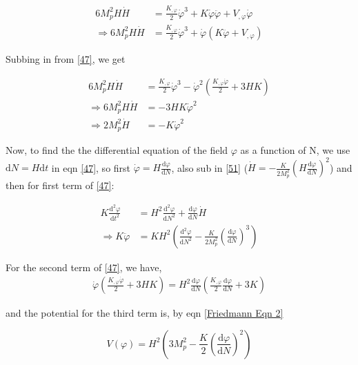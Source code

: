 \documentclass{article}
\begin{document}
\begin{align}   
     6 M_p^2H \dot{H} &= \frac{K_{,\varphi}}{2} \dot{\varphi}^3 + K \dot{\varphi} \ddot{\varphi} + V_{,\varphi} \dot{\varphi} \nonumber \\
     \Rightarrow 6 M_p^2H \dot{H} &= \frac{K_{,\varphi}}{2} \dot{\varphi}^3 + \dot{\varphi} (K  \ddot{\varphi} + V_{,\varphi}) 
\end{align}

Subbing in from \ref{47}, we get

\begin{align}   \label{51}
    6 M_p^2H \dot{H} &= \frac{K_{,\varphi}}{2} \dot{\varphi}^3 - \dot{\varphi}^2 \left(\frac{K_{,\varphi} \dot{\varphi}}{2} + 3H K \right) \nonumber \\
    \Rightarrow 6 M_p^2H \dot{H} &= - 3H K \dot{\varphi}^2   \nonumber \\ 
    \Rightarrow 2 M_p^2 \dot{H} &= -  K \dot{\varphi}^2
\end{align}

Now, to find the the differential equation of the field $\varphi$ as a function of N, we use $\text{d}N = H \text{d}t$ in eqn \ref{47}, so first $ \dot{\varphi} = H \frac{\text{d}\varphi}{\text{d}N}$, also sub in \ref{51} ($\dot{H} = -  \frac{K}{2 M_p^2 } \left(H \frac{\text{d}\varphi}{\text{d}N} \right)^2$) and then for first term of \ref{47}:

\begin{align} \label{52}
    K \frac{\text{d}^2\varphi}{\text{d}t^2} &= H^2 \frac{\text{d}^2\varphi}{\text{d}N^2} + \frac{\text{d}\varphi}{\text{d}N}\dot{H} \nonumber \\
    \Rightarrow K \ddot{\varphi} &= K H^2 \left( \frac{\text{d}^2\varphi}{\text{d}N^2} - \frac{K}{2M_p^2} \left(\frac{\text{d}\varphi}{\text{d}N} \right)^3 \right) 
\end{align}

For the second term of \ref{47}, we have, 
\begin{align}
    \dot{\varphi} \left(\frac{K_{,\varphi} \dot{\varphi}}{2} + 3H K \right) = H^2 \frac{\text{d}\varphi}{\text{d}N} \left(\frac{K_{,\varphi}}{2} \frac{\text{d}\varphi}{\text{d}N}+ 3 K \right)
\end{align}

and the potential for the third term is, by eqn \ref{Friedmann Eqn 2}

\begin{equation}
    V(\varphi) = H^2 \left( 3 M_p^2 - \frac{K}{2} \left(\frac{\text{d}\varphi}{\text{d}N} \right)^2 \right)
\end{equation}
\end{document}
